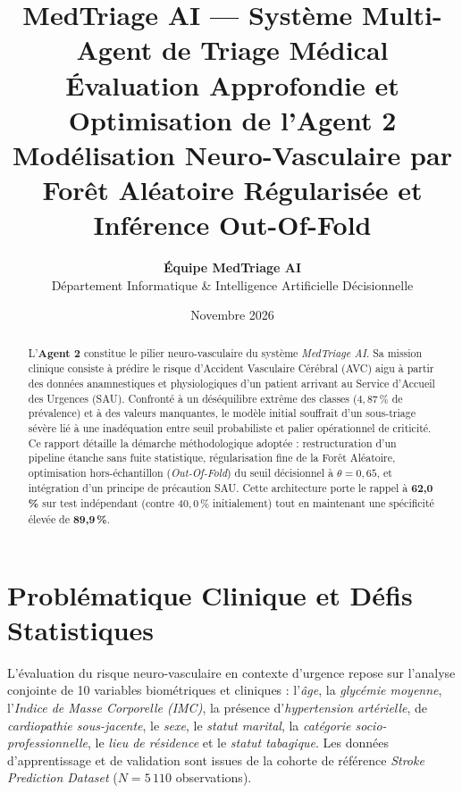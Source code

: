 \documentclass[11pt,a4paper]{article}
\title{\vspace{-1.5cm}
\textbf{\huge\color{medblue} MedTriage AI --- Système Multi-Agent de Triage Médical}\\[0.3cm]
\textbf{\Large Évaluation Approfondie et Optimisation de l'Agent 2}\\
\large\color{darkgray} Modélisation Neuro-Vasculaire par Forêt Aléatoire Régularisée et Inférence Out-Of-Fold
}
\author{\textbf{Équipe MedTriage AI} \\ Département Informatique \& Intelligence Artificielle Décisionnelle}
\date{Novembre 2026}
\begin{document}
\maketitle

\begin{abstract}
L'\textbf{Agent 2} constitue le pilier neuro-vasculaire du système \emph{MedTriage AI}. Sa mission clinique consiste à prédire le risque d'Accident Vasculaire Cérébral (AVC) aigu à partir des données anamnestiques et physiologiques d'un patient arrivant au Service d'Accueil des Urgences (SAU). Confronté à un déséquilibre extrême des classes ($4{,}87\,\%$ de prévalence) et à des valeurs manquantes, le modèle initial souffrait d'un sous-triage sévère lié à une inadéquation entre seuil probabiliste et palier opérationnel de criticité. Ce rapport détaille la démarche méthodologique adoptée : restructuration d'un pipeline étanche sans fuite statistique, régularisation fine de la Forêt Aléatoire, optimisation hors-échantillon (\emph{Out-Of-Fold}) du seuil décisionnel à $\theta = 0{,}65$, et intégration d'un principe de précaution SAU. Cette architecture porte le rappel à \textbf{62{,}0\,\%} sur test indépendant (contre $40{,}0\,\%$ initialement) tout en maintenant une spécificité élevée de \textbf{89{,}9\,\%}.
\end{abstract}

\vspace{0.3cm}

\section{Problématique Clinique et Défis Statistiques}

L'évaluation du risque neuro-vasculaire en contexte d'urgence repose sur l'analyse conjointe de 10 variables biométriques et cliniques : l'\emph{âge}, la \emph{glycémie moyenne}, l'\emph{Indice de Masse Corporelle (IMC)}, la présence d'\emph{hypertension artérielle}, de \emph{cardiopathie sous-jacente}, le \emph{sexe}, le \emph{statut marital}, la \emph{catégorie socio-professionnelle}, le \emph{lieu de résidence} et le \emph{statut tabagique}. Les données d'apprentissage et de validation sont issues de la cohorte de référence \emph{Stroke Prediction Dataset} ($N = 5\,110$ observations).
\end{document}
